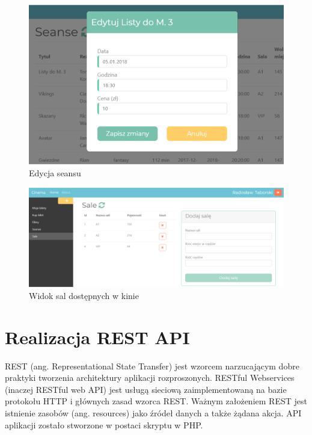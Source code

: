 \begin{figure} [H]
	\centering
	\includegraphics[width=1\linewidth]{rozdzial05/interfejs/edytujSeans.png}
	\caption{Edycja seansu}
	\label{fig:schem}
\end{figure}

\begin{figure} [H]
	\centering
	\includegraphics[width=1\linewidth]{rozdzial05/interfejs/sale.png}
	\caption{Widok sal dostępnych w kinie}
	\label{fig:schem}
\end{figure}

\section{Realizacja REST API}

REST (ang. Representational State Transfer) jest wzorcem narzucającym dobre praktyki tworzenia architektury aplikacji rozproszonych. RESTful Webservices (inaczej RESTful web API) jest usługą sieciową zaimplementowaną na bazie protokołu HTTP i głównych zasad wzorca REST. Ważnym założeniem REST jest istnienie zasobów (ang. resources) jako źródeł danych a także żądana akcja. API aplikacji zostało stworzone w postaci skryptu w PHP.

